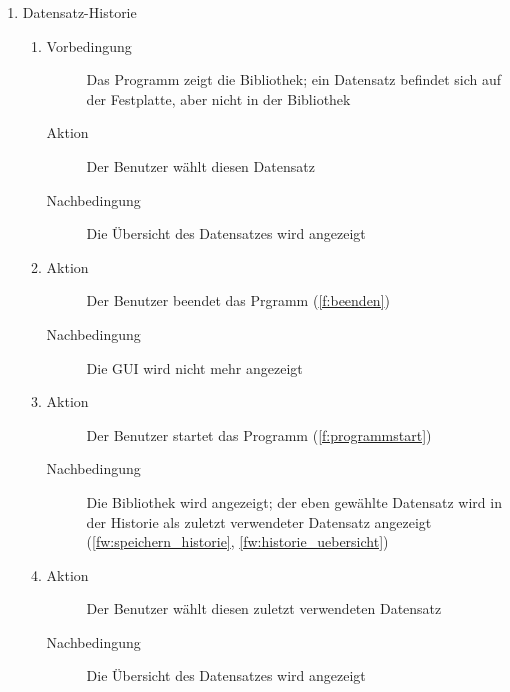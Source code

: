 \begin{enumerate} [label=\bfseries /TSW \arabic*0/, leftmargin=*]
	\item Datensatz-Historie \label{ts:historie}
	\begin{enumerate}[leftmargin=0pt]
		\item
		\begin{description}
			\item[Vorbedingung] Das Programm zeigt die Bibliothek; ein Datensatz befindet sich auf der Festplatte, aber nicht in der Bibliothek
			\item[Aktion] Der Benutzer wählt diesen Datensatz
			\item[Nachbedingung] Die Übersicht des Datensatzes wird angezeigt
		\end{description}
		\item
		\begin{description}
			\item[Aktion] Der Benutzer beendet das Prgramm (\ref{f:beenden})
			\item[Nachbedingung] Die GUI wird nicht mehr angezeigt
		\end{description}
		\item
		\begin{description}
			\item[Aktion] Der Benutzer startet das Programm (\ref{f:programmstart})
			\item[Nachbedingung] Die Bibliothek wird angezeigt; der eben gewählte Datensatz wird in der Historie als zuletzt verwendeter Datensatz angezeigt (\ref{fw:speichern_historie}, \ref{fw:historie_uebersicht})
		\end{description}
		\item
		\begin{description}
			\item[Aktion] Der Benutzer wählt diesen zuletzt verwendeten Datensatz
			\item[Nachbedingung] Die Übersicht des Datensatzes wird angezeigt
		\end{description}
	\end{enumerate}


\end{enumerate}

